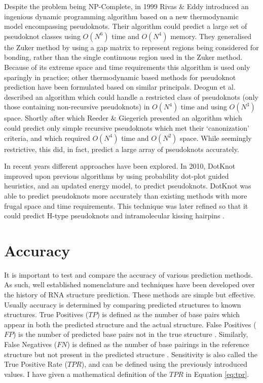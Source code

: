\documentclass{cshonours}
\begin{document}
Despite the problem being NP-Complete, in 1999 Rivas \& Eddy \cite{rivas1999dynamic} introduced an ingenious dynamic
programming algorithm based on a new thermodynamic model encompassing pseudoknots. Their algorithm could predict a large set of pseudoknot classes using
$O(N^6)$ time and $O(N^4)$ memory. They generalised the Zuker method by using a gap matrix to represent regions being considered for bonding, rather than
the single continuous region used in the Zuker method. Because of its extreme
space and time requirements this algorithm is used only sparingly in practice; other thermodynamic based methods for pseudoknot prediction have
been formulated based on similar principals. Deogun et al. \cite{deogun2004rna} described an algorithm which could handle a restricted class of pseudoknots (only those containing
non-recursive pseudoknots) in $O(N^4)$ time and using $O(N^3)$ space. Shortly after which Reeder \& Giegerich \cite{reeder2004design} presented an algorithm which could predict
only simple recursive pseudoknots which met their `canonization' criteria, and which required $O(N^4)$ time and $O(N^2)$ space. While
seemingly restrictive, this did, in fact, predict a large array of pseudoknots accurately. 

In recent years different approaches have been explored. In 2010, DotKnot \cite{sperschneider2010dotknot} improved upon previous algorithms by using probability dot-plot guided heuristics, and an updated energy model, to predict pseudoknots. DotKnot was able to predict pseudoknots more accurately than existing methods with more frugal space and time requirements. This technique was later refined so that it could predict H-type pseudoknots and intramolecular kissing hairpins \cite{sperschneider2011heuristic}.


\section{Accuracy}
It is important to test and compare the accuracy of various prediction methods.
As such, well established nomenclature and techniques have been developed over
the history of RNA structure prediction. These methods are simple but effective. Usually accuracy is determined by comparing predicted structures to known
structures. True Positives ($TP$) is defined as the number of base pairs which appear in both the predicted structure and the actual structure. False Positives
($FP$) is the number of predicted base pairs not in the true
structure \cite{lorenz2011viennarna}. Similarly, False Negatives ($FN$) is defined as the number of base
pairings in the reference structure but not present in the predicted structure \cite{lorenz2011viennarna}.
Sensitivity is also called the True Positive Rate ($TPR$), and can be defined using the previously introduced values. I have given a mathematical definition of the $TPR$ in Equation \ref{eq:tpr}.
\end{document}
